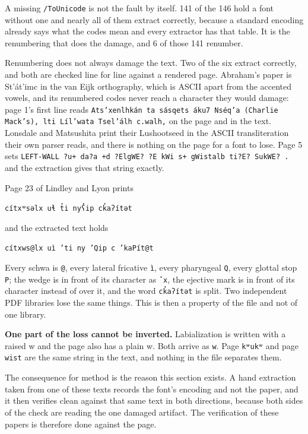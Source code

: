 A missing \texttt{/ToUnicode} is not the fault by itself. 141 of the 146 hold a font without one and nearly all of them extract correctly, because a standard encoding already says what the codes mean and every extractor has that table. It is the renumbering that does the damage, and 6 of those 141 renumber.

Renumbering does not always damage the text. Two of the six extract correctly, and both are checked line for line against a rendered page. Abraham's paper is St'át'imc in the van Eijk orthography, which is ASCII apart from the accented vowels, and its renumbered codes never reach a character they would damage: page 1's first line reads \texttt{Ats’xenlhkán ta sásqets áku7 Nséq’a (Charlie Mack’s), lti Líl’wata Tsel’álh c.walh,} on the page and in the text. Lonsdale and Matsushita print their Lushootseed in the ASCII transliteration their own parser reads, and there is nothing on the page for a font to lose. Page 5 sets \texttt{LEFT-WALL ?u+ da?a +d ?ElgWE? ?E kWi s+ gWistalb ti?E? SukWE? .} and the extraction gives that string exactly.

Page 23 of Lindley and Lyon prints

\texttt{cítxʷsəlx uɬ t̓i nyʕ̓ip ck̓aʔítət}

and the extracted text holds

\texttt{cítxws@lx uì ’ti ny ’Qip c ’kaPít@t}

Every schwa is \texttt{@}, every lateral fricative \texttt{ì}, every pharyngeal \texttt{Q}, every glottal stop \texttt{P}; the wedge is in front of its character as \texttt{ˇx}, the ejective mark is in front of its character instead of over it, and the word \texttt{ck̓aʔítət} is split. Two independent PDF libraries lose the same things. This is then a property of the file and not of one library.

\textbf{One part of the loss cannot be inverted.} Labialization is written with a raised w and the page also has a plain w. Both arrive as \texttt{w}. Page \texttt{kʷukʷ} and page \texttt{wist} are the same string in the text, and nothing in the file separates them.

The consequence for method is the reason this section exists. A hand extraction taken from one of these texts records the font's encoding and not the paper, and it then verifies clean against that same text in both directions, because both sides of the check are reading the one damaged artifact. The verification of these papers is therefore done against the page.

